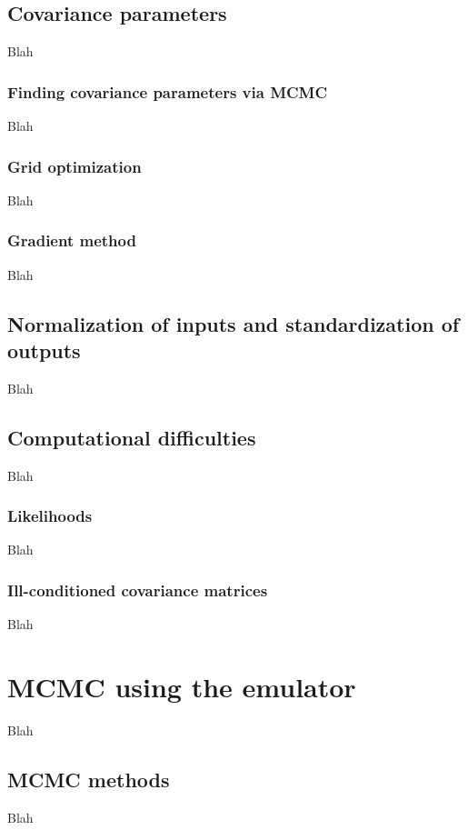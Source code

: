 \documentclass{article}
\begin{document}
\subsection{Covariance parameters}
Blah

\subsubsection{Finding covariance parameters via MCMC}
Blah

\subsubsection{Grid optimization}
Blah

\subsubsection{Gradient method}
Blah

\subsection{Normalization of inputs and standardization of outputs}
Blah

\subsection{Computational difficulties}
Blah

\subsubsection{Likelihoods}
Blah

\subsubsection{Ill-conditioned covariance matrices}
Blah

\section{MCMC using the emulator}
Blah

\subsection{MCMC methods}
Blah
\end{document}
